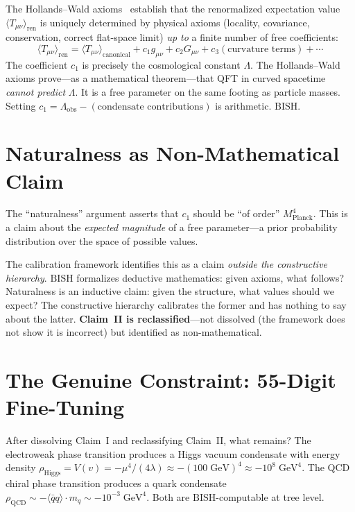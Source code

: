 \documentclass[11pt,a4paper]{report}
\theoremstyle{plain}
\theoremstyle{definition}
\theoremstyle{remark}
\newcommand{\BISH}{\mathrm{BISH}}
\begin{document}
The Hollands--Wald axioms~\cite{HollandsWald2005} establish that the renormalized expectation value $\langle T_{\mu\nu}\rangle_{\mathrm{ren}}$ is uniquely determined by physical axioms (locality, covariance, conservation, correct flat-space limit) \emph{up to} a finite number of free coefficients:
\[
  \langle T_{\mu\nu}\rangle_{\mathrm{ren}} = \langle T_{\mu\nu}\rangle_{\mathrm{canonical}} + c_1 g_{\mu\nu} + c_2 G_{\mu\nu} + c_3(\text{curvature terms}) + \cdots
\]
The coefficient $c_1$ is precisely the cosmological constant $\Lambda$. The Hollands--Wald axioms prove---as a mathematical theorem---that QFT in curved spacetime \emph{cannot predict} $\Lambda$. It is a free parameter on the same footing as particle masses. Setting $c_1 = \Lambda_{\mathrm{obs}} - (\text{condensate contributions})$ is arithmetic. $\BISH$.

\section{Naturalness as Non-Mathematical Claim}

The ``naturalness'' argument asserts that $c_1$ should be ``of order'' $M_{\mathrm{Planck}}^4$. This is a claim about the \emph{expected magnitude} of a free parameter---a prior probability distribution over the space of possible values.

The calibration framework identifies this as a claim \emph{outside the constructive hierarchy}. $\BISH$ formalizes deductive mathematics: given axioms, what follows? Naturalness is an inductive claim: given the structure, what values should we expect? The constructive hierarchy calibrates the former and has nothing to say about the latter. \textbf{Claim~II is reclassified}---not dissolved (the framework does not show it is incorrect) but identified as non-mathematical.

\section{The Genuine Constraint: 55-Digit Fine-Tuning}

After dissolving Claim~I and reclassifying Claim~II, what remains? The electroweak phase transition produces a Higgs vacuum condensate with energy density $\rho_{\mathrm{Higgs}} = V(v) = -\mu^4/(4\lambda) \approx -(100\;\mathrm{GeV})^4 \approx -10^8\;\mathrm{GeV}^4$. The QCD chiral phase transition produces a quark condensate $\rho_{\mathrm{QCD}} \sim -\langle\bar{q}q\rangle \cdot m_q \sim -10^{-3}\;\mathrm{GeV}^4$. Both are $\BISH$-computable at tree level.
\end{document}
